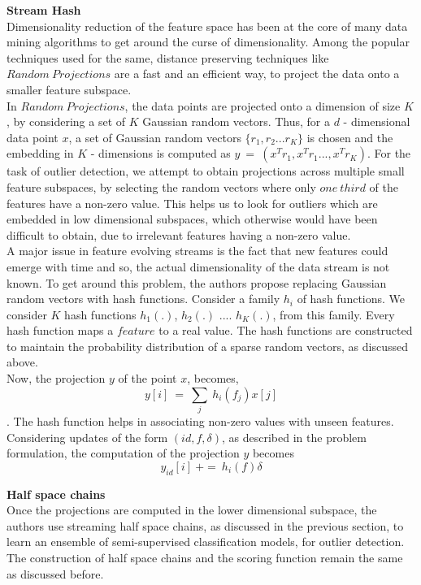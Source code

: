 \noindent \textbf{Stream Hash} \\

Dimensionality reduction of the feature space has been at the core of many data mining algorithms to get around the curse of dimensionality. Among the popular techniques used for the same, distance preserving techniques like $Random\ Projections$ are a fast and an efficient way, to project the data onto a smaller feature subspace. \\

In $Random\ Projections$, the data points are projected onto a dimension of size $K$, by considering a set of $K$ Gaussian random vectors. Thus, for a $d$ - dimensional data point $x$, a set of Gaussian random vectors $\{r_1,r_2...r_K\}$ is chosen and the embedding in $K$ - dimensions is computed as $y\ =\ (x^Tr_1,x^Tr_1...,x^Tr_K)$. For the task of outlier detection, we attempt to obtain projections across multiple small feature subspaces, by selecting the random vectors where only $one\ third$ of the features have a non-zero value. This helps us to look for outliers which are embedded in low dimensional subspaces, which otherwise would have been difficult to obtain, due to irrelevant features having a non-zero value. \\

A major issue in feature evolving streams is the fact that new features could emerge with time and so, the actual dimensionality of the data stream is not known. To get around this problem, the authors propose replacing Gaussian random vectors with hash functions. Consider a family $h_i$ of hash functions. We consider $K$ hash functions $h_1(.)$, $h_2(.)$ .... $h_K(.)$, from this family. Every hash function maps a $feature$ to a real value. The hash functions are constructed to maintain the probability distribution of a sparse random vectors, as discussed above.\\

Now, the projection $y$ of the point $x$, becomes, $$y[i]\ =\ \sum_{j}\ h_i(f_j)x[j]$$. The hash function helps in associating non-zero values with unseen features. Considering updates of the form $(id, f, \delta)$, as described in the problem formulation, the computation of the projection $y$ becomes $$y_{id}[i]\ +=\ h_i(f)\delta$$

\noindent \textbf{Half space chains} \\

Once the projections are computed in the lower dimensional subspace, the authors use streaming half space chains, as discussed in the previous section, to learn an ensemble of semi-supervised classification models, for outlier detection. The construction of half space chains and the scoring function remain the same as discussed before. \\

